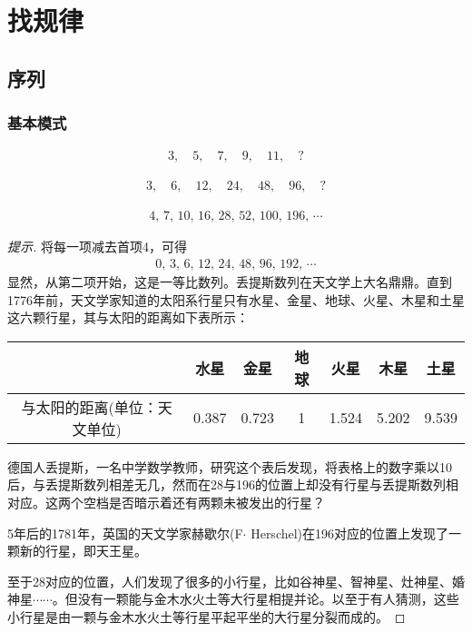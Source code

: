 
\chapter{找规律}
\label{chap:pattern}

\section{序列}
\label{sec:series-pattern}

\subsection{基本模式}
\label{sec:basic-patterns-of-sequences}

\begin{example}[等差数列]
  \begin{align*}
    3,\quad 5,\quad 7,\quad 9,\quad 11,\quad ?
  \end{align*}
\end{example}

\begin{example}[等比数列]
  \begin{align*}
    3,\quad 6,\quad 12,\quad 24,\quad 48,\quad 96,\quad ?
  \end{align*}
\end{example}

\begin{example}[丢提斯数列]
  \begin{align*}
    4,\, 7,\, 10,\, 16,\, 28,\, 52,\, 100,\, 196,\, \cdots
  \end{align*}
\end{example}
\begin{proof}[提示]
  将每一项减去首项4，可得
  \begin{align*}
    0,\, 3,\, 6,\, 12,\, 24,\, 48,\, 96,\, 192,\, \cdots
  \end{align*}
  显然，从第二项开始，这是一等比数列。丢提斯数列在天文学上大名鼎鼎。直到1776年前，天文学家知道的太阳系行星只有水星、金星、地球、火星、木星和土星这六颗行星，其与太阳的距离如下表所示：
  \begin{center}
    \begin{tabular}{ccccccc}
      \hline
      & 水星 & 金星 & 地球 & 火星 & 木星 & 土星\\
      \hline
      与太阳的距离(单位：天文单位) & 0.387 & 0.723 & 1 & 1.524 & 5.202 & 9.539\\
      \hline
    \end{tabular}
  \end{center}
  德国人丢提斯，一名中学数学教师，研究这个表后发现，将表格上的数字乘以10后，与丢提斯数列相差无几，然而在28与196的位置上却没有行星与丢提斯数列相对应。这两个空档是否暗示着还有两颗未被发出的行星？

  5年后的1781年，英国的天文学家赫歇尔(F$\cdot$ Herschel)在196对应的位置上发现了一颗新的行星，即天王星。

  至于28对应的位置，人们发现了很多的小行星，比如谷神星、智神星、灶神星、婚神星$\cdots\cdots$。但没有一颗能与金木水火土等大行星相提并论。以至于有人猜测，这些小行星是由一颗与金木水火土等行星平起平坐的大行星分裂而成的。
\end{proof}

